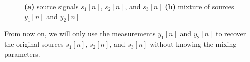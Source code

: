 \documentclass[a4paper,11pt]{article}
\begin{document}
\begin{figure}[H]
\centering
{}
\centering
{}
\caption{\textbf{(a)} source signals $s_1[n]$, $s_2[n]$, and $s_3[n]$ \; \textbf{(b)} mixture of sources $y_1[n]$ and $y_2[n]$}
\label{fig:long}
\label{fig:onecol}
\end{figure}

\noindent From now on, we will only use the measurements $y_1[n]$ and $y_2[n]$ to recover the original sources $s_1[n]$, $s_2[n]$, and $s_3[n]$ without knowing the mixing parameters.
\end{document}
